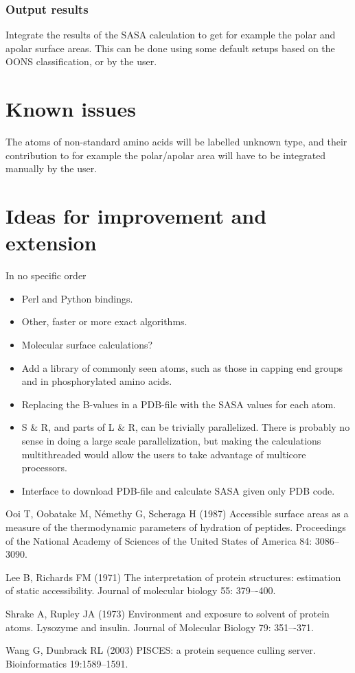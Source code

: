 \documentclass[a4paper,11pt]{article}
\begin{document}
\subsubsection{Output results}
Integrate the results of the SASA calculation to get for example the
polar and apolar surface areas. This can be done using some default
setups based on the OONS classification, or by the user.

\section{Known issues}

The atoms of non-standard amino acids will be labelled unknown type,
and their contribution to for example the polar/apolar area will have
to be integrated manually by the user.

\section{Ideas for improvement and extension}

In no specific order
\begin{itemize}
\item Perl and Python bindings.
\item Other, faster or more exact algorithms.
\item Molecular surface calculations?
\item Add a library of commonly seen atoms, such as those in capping
  end groups and in phosphorylated amino acids.
\item Replacing the B-values in a PDB-file with the SASA values for
  each atom.
\item S \& R, and parts of L \& R, can be trivially
  parallelized. There is probably no sense in doing a large scale
  parallelization, but making the calculations multithreaded would
  allow the users to take advantage of multicore processors.
\item Interface to download PDB-file and calculate SASA given only PDB
  code.
\end{itemize}

\begin{thebibliography}{50}

  Ooi T, Oobatake M, Némethy G, Scheraga H (1987)
  Accessible surface areas as a measure of the thermodynamic
  parameters of hydration of peptides. Proceedings of the National
  Academy of Sciences of the United States of America 84: 3086–3090.

  Lee B, Richards FM (1971) The interpretation of protein
  structures: estimation of static accessibility. Journal of molecular
  biology 55: 379–-400.

  Shrake A, Rupley JA (1973) Environment and exposure to
  solvent of protein atoms. Lysozyme and insulin. Journal of Molecular
  Biology 79: 351–-371.

  Wang G, Dunbrack RL (2003) PISCES: a protein sequence culling server. 
  Bioinformatics 19:1589--1591.

\end{thebibliography}
\end{document}
